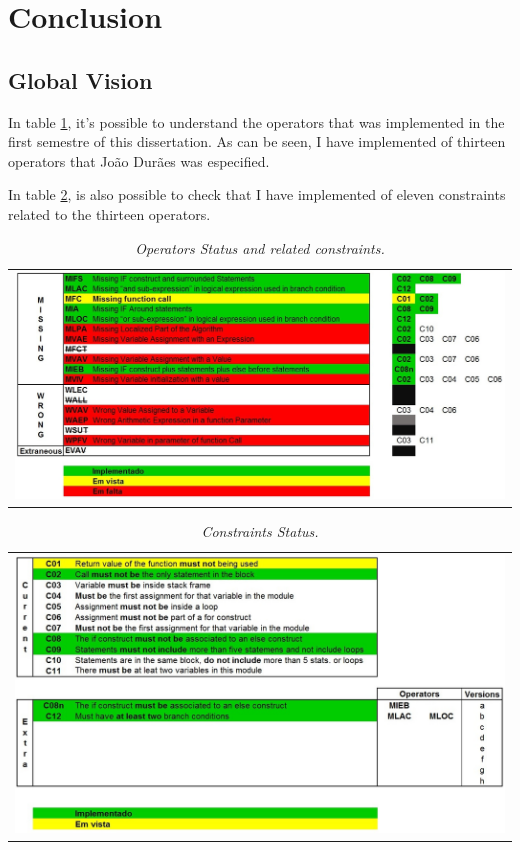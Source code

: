 \clearpage
\section{Conclusion}

\subsection{Global Vision}

In table \ref{tab:operators_status}, it's possible to understand the operators that was implemented in the first semestre of this dissertation. As can be seen, I have implemented  of thirteen operators that João Durães was especified.

In table \ref{tab:constraints_status}, is also possible to check that I have implemented  of eleven constraints related to the thirteen operators.

\begin{table}[ht]
\begin{tabular}{c}
\includegraphics[width=1.1\textwidth]{img/operators_status.jpg}
\end{tabular}
\caption{\small \sl Operators Status and related constraints.\label{tab:operators_status}}
\end{table}



\begin{table}[ht]
\begin{tabular}{c}
\includegraphics[width=1.1\textwidth]{img/constraints_status.jpg}
\end{tabular}
\caption{\small \sl Constraints Status.\label{tab:constraints_status}}
\end{table}

